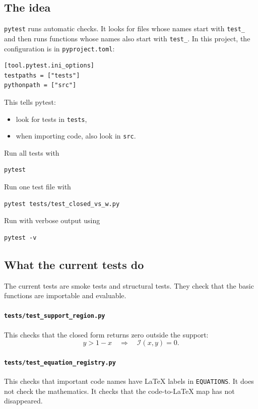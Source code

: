 \documentclass[11pt,a4paper]{article}
\begin{document}
\subsection{The idea}

\texttt{pytest} runs automatic checks. It looks for files whose names start with \texttt{test\_} and then runs functions whose names also start with \texttt{test\_}. In this project, the configuration is in \texttt{pyproject.toml}:
\begin{lstlisting}
[tool.pytest.ini_options]
testpaths = ["tests"]
pythonpath = ["src"]
\end{lstlisting}
This tells pytest:
\begin{itemize}
  \item look for tests in \texttt{tests},
  \item when importing code, also look in \texttt{src}.
\end{itemize}

Run all tests with
\begin{lstlisting}
pytest
\end{lstlisting}
Run one test file with
\begin{lstlisting}
pytest tests/test_closed_vs_w.py
\end{lstlisting}
Run with verbose output using
\begin{lstlisting}
pytest -v
\end{lstlisting}

\subsection{What the current tests do}

The current tests are smoke tests and structural tests. They check that the basic functions are importable and evaluable.

\paragraph{\texttt{tests/test\_support\_region.py}}
This checks that the closed form returns zero outside the support:
\begin{equation}
  y > 1-x \quad \Rightarrow \quad \mathcal I(x,y)=0.
\end{equation}

\paragraph{\texttt{tests/test\_equation\_registry.py}}
This checks that important code names have LaTeX labels in \texttt{EQUATIONS}. It does not check the mathematics. It checks that the code-to-LaTeX map has not disappeared.
\end{document}
